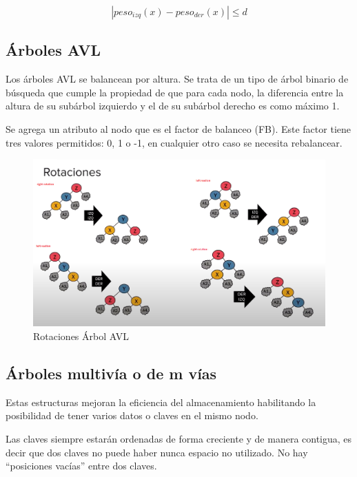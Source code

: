 \documentclass[../main.tex]{subfiles}
\begin{document}
            \begin{equation}
                |peso_{izq}(x) - peso_{der}(x)| \leq d
            \end{equation}

    \subsection{Árboles AVL}
        Los árboles AVL se balancean por altura. Se trata de un tipo de árbol binario de búsqueda que cumple la propiedad de que para cada nodo, la diferencia entre la altura de su subárbol izquierdo y el de su subárbol derecho es como máximo 1.
        
        Se agrega un atributo al nodo que es el factor de balanceo (FB). Este factor tiene tres valores permitidos: 0, 1 o -1, en cualquier otro caso se necesita rebalancear.

        \begin{figure}[ht]
            \centering
            \includegraphics[width=1\textwidth]{images/Rotaciones.png}
            \caption{Rotaciones Árbol AVL}
            \label{fig:AVL} 
        \end{figure}

    \subsection{Árboles multivía o de m vías}
        Estas estructuras mejoran la eficiencia del almacenamiento habilitando la posibilidad de tener varios datos o claves en el mismo nodo.
        
        Las claves siempre estarán ordenadas de forma creciente y de manera contigua, es decir que dos claves no puede haber nunca espacio no utilizado. No hay “posiciones vacías” entre dos claves.
\end{document}
